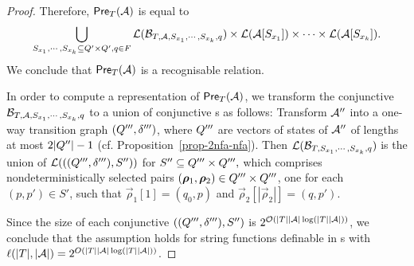 \begin{proof}
\medskip


Therefore, $\textsf{Pre}_{T}(\mathcal{A})$ is equal to 
\[
\bigcup_{S_{x_1}, \cdots, S_{x_k} \subseteq Q' \times Q', q\in F} \mathcal{L}(\mathcal{B}_{T, \mathcal{A}, S_{x_1}, \cdots, S_{x_k},q}) \times \mathcal{L}(\mathcal{A}[S_{x_1}]) \times \cdots  \times \mathcal{L}(\mathcal{A}[S_{x_k}]).\]
%
We conclude that $\textsf{Pre}_{T}(\mathcal{A})$ is a recognisable relation. 

In order to compute a representation of $\textsf{Pre}_{T}(\mathcal{A})$, we transform the conjunctive \FFA{} $\mathcal{B}_{T, \mathcal{A}, S_{x_1}, \cdots, S_{x_k},q}$ to a union of conjunctive \FA{}s as follows: Transform $\mathcal{A}''$ into a one-way transition graph $(Q''',\delta''')$, where $Q'''$ are vectors of states of $\mathcal{A}''$ of lengths at most $2|Q''|-1$ (cf. Proposition~\ref{prop-2nfa-nfa}). Then $\mathcal{L}(\mathcal{B}_{T, S_{x_1}, \cdots, S_{x_k},q})$ is the union of $\mathcal{L}(((Q''',\delta'''), S''))$ for $S'' \subseteq Q''' \times Q''',$ which comprises nondeterministically selected pairs $(\vec{\rho}_1, \vec{\rho}_2) \in \controls''' \times \controls'''$, one for each $(p, p') \in S'$, such that $\vec{\rho}_1[1] =(q_0, p)$ and  $\vec{\rho}_2[|\vec{\rho}_2|] = (q, p')$.

Since the size of each conjunctive \FA{} $((Q''',\delta'''), S'')$ is $ 2^{\mathcal{O}(|T||\mathcal{A}|\log (|T||\mathcal{A}|))}$, we conclude that 
the \prerec{} assumption holds for string functions definable in \PPT{}s with $\ell(|T|, |\mathcal{A}|) = 2^{O(|T||\mathcal{A}|\log (|T||\mathcal{A}|))}$.
\end{proof}

